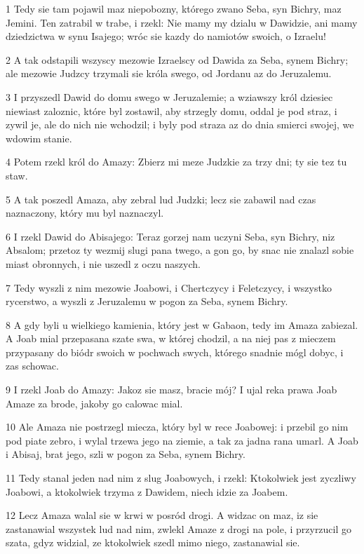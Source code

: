 \par 1 Tedy sie tam pojawil maz niepobozny, którego zwano Seba, syn Bichry, maz Jemini. Ten zatrabil w trabe, i rzekl: Nie mamy my dzialu w Dawidzie, ani mamy dziedzictwa w synu Isajego; wróc sie kazdy do namiotów swoich, o Izraelu!
\par 2 A tak odstapili wszyscy mezowie Izraelscy od Dawida za Seba, synem Bichry; ale mezowie Judzcy trzymali sie króla swego, od Jordanu az do Jeruzalemu.
\par 3 I przyszedl Dawid do domu swego w Jeruzalemie; a wziawszy król dziesiec niewiast zaloznic, które byl zostawil, aby strzegly domu, oddal je pod straz, i zywil je, ale do nich nie wchodzil; i byly pod straza az do dnia smierci swojej, we wdowim stanie.
\par 4 Potem rzekl król do Amazy: Zbierz mi meze Judzkie za trzy dni; ty sie tez tu staw.
\par 5 A tak poszedl Amaza, aby zebral lud Judzki; lecz sie zabawil nad czas naznaczony, który mu byl naznaczyl.
\par 6 I rzekl Dawid do Abisajego: Teraz gorzej nam uczyni Seba, syn Bichry, niz Absalom; przetoz ty wezmij slugi pana twego, a gon go, by snac nie znalazl sobie miast obronnych, i nie uszedl z oczu naszych.
\par 7 Tedy wyszli z nim mezowie Joabowi, i Chertczycy i Feletczycy, i wszystko rycerstwo, a wyszli z Jeruzalemu w pogon za Seba, synem Bichry.
\par 8 A gdy byli u wielkiego kamienia, który jest w Gabaon, tedy im Amaza zabiezal. A Joab mial przepasana szate swa, w której chodzil, a na niej pas z mieczem przypasany do biódr swoich w pochwach swych, którego snadnie mógl dobyc, i zas schowac.
\par 9 I rzekl Joab do Amazy: Jakoz sie masz, bracie mój? I ujal reka prawa Joab Amaze za brode, jakoby go calowac mial.
\par 10 Ale Amaza nie postrzegl miecza, który byl w rece Joabowej: i przebil go nim pod piate zebro, i wylal trzewa jego na ziemie, a tak za jadna rana umarl. A Joab i Abisaj, brat jego, szli w pogon za Seba, synem Bichry.
\par 11 Tedy stanal jeden nad nim z slug Joabowych, i rzekl: Ktokolwiek jest zyczliwy Joabowi, a ktokolwiek trzyma z Dawidem, niech idzie za Joabem.
\par 12 Lecz Amaza walal sie w krwi w posród drogi. A widzac on maz, iz sie zastanawial wszystek lud nad nim, zwlekl Amaze z drogi na pole, i przyrzucil go szata, gdyz widzial, ze ktokolwiek szedl mimo niego, zastanawial sie.
